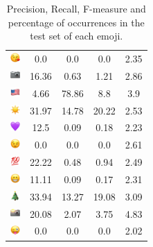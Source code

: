 \documentclass{article}
\begin{document}
\begin{table}
\begin{tabular}{|c|ccc|c|}
\includegraphics[height=0.37cm,width=0.37cm]{img/face_blowing_a_kiss.png} & 0.0 & 0.0 & 0.0 & 2.35\\ 
\includegraphics[height=0.37cm,width=0.37cm]{img/camera.png} & 16.36 & 0.63 & 1.21 & 2.86\\ 
\includegraphics[height=0.37cm,width=0.37cm]{img/United_States.png} & 4.66 & 78.86 & 8.8 & 3.9\\ 
\includegraphics[height=0.37cm,width=0.37cm]{img/sun.png} & 31.97 & 14.78 & 20.22 & 2.53\\ 
\includegraphics[height=0.37cm,width=0.37cm]{img/purple_heart.png} & 12.5 & 0.09 & 0.18 & 2.23\\ 
\includegraphics[height=0.37cm,width=0.37cm]{img/winking_face.png} & 0.0 & 0.0 & 0.0 & 2.61\\ 
\includegraphics[height=0.37cm,width=0.37cm]{img/hundred_points.png} & 22.22 & 0.48 & 0.94 & 2.49\\ 
\includegraphics[height=0.37cm,width=0.37cm]{img/beaming_face_with_smiling_eyes.png} & 11.11 & 0.09 & 0.17 & 2.31\\ 
\includegraphics[height=0.37cm,width=0.37cm]{img/Christmas_tree.png} & 33.94 & 13.27 & 19.08 & 3.09\\ 
\includegraphics[height=0.37cm,width=0.37cm]{img/camera_with_flash.png} & 20.08 & 2.07 & 3.75 & 4.83\\ 
\includegraphics[height=0.37cm,width=0.37cm]{img/winking_face_with_tongue.png} & 0.0 & 0.0 & 0.0 & 2.02\\ 

\hline
\end{tabular}
\caption{\label{table:emoji_detailed} Precision, Recall, F-measure and percentage of occurrences in the test set of each emoji.}
\end{table}
\end{document}
